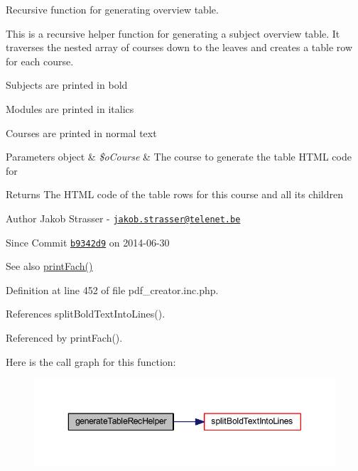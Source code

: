 Recursive function for generating overview table. 

This is a recursive helper function for generating a subject overview table. It traverses the nested array of courses down to the leaves and creates a table row for each course.
\begin{DoxyItemize}
\item Subjects are printed in bold
\item Modules are printed in italics
\item Courses are printed in normal text
\end{DoxyItemize}


\begin{DoxyParams}[1]{Parameters}
object & {\em \$o\+Course} & The course to generate the table H\+T\+M\+L code for \\
\hline
\end{DoxyParams}
\begin{DoxyReturn}{Returns}
The H\+T\+M\+L code of the table rows for this course and all its children
\end{DoxyReturn}
\begin{DoxyAuthor}{Author}
Jakob Strasser -\/ \href{mailto:jakob.strasser@telenet.be}{\tt jakob.\+strasser@telenet.\+be} 
\end{DoxyAuthor}
\begin{DoxySince}{Since}
Commit \href{http://github.com/TheJake123/DrupalModul/commit/b9342d941b3f93e212f3f6af0823a07524dd5954}{\tt b9342d9} on 2014-\/06-\/30
\end{DoxySince}
\begin{DoxySeeAlso}{See also}
\hyperlink{classoverview_p_d_f_abf0674d88080affc25c472fbd0525896}{print\+Fach()} 
\end{DoxySeeAlso}


Definition at line 452 of file pdf\+\_\+creator.\+inc.\+php.



References split\+Bold\+Text\+Into\+Lines().



Referenced by print\+Fach().



Here is the call graph for this function\+:
\nopagebreak
\begin{figure}[H]
\begin{center}
\leavevmode
\includegraphics[width=350pt]{classoverview_p_d_f_ad0ea6c6476d690b08161300e40926dc6_cgraph}
\end{center}
\end{figure}




